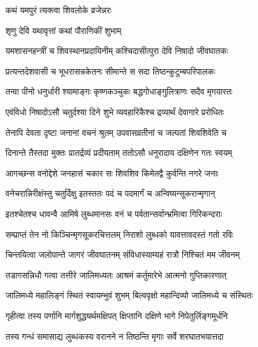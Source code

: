 \onelineshloka
{कथं यमपुरं त्यक्त्वा शिवलोके व्रजेन्नरः}%



\onelineshloka
{शृणु देवि यथावृत्तां कथां पौराणिकीं शुभाम्}%

\twolineshloka
{यमशासनहन्त्रीं च शिवस्थानप्रदायिनीम्}
{कश्चिदासीत्पुरा देवि निषादो जीवघातकः\footnotemark{}}%

\twolineshloka
{प्रत्यन्तदेशवासी च भूधरासन्नकेतनः}
{सीमान्ते स सदा तिष्ठन्कुटुम्बपरिपालकः}%

\twolineshloka
{तन्वा पीनो धनुर्धारी श्यामाङ्गः कृष्णकञ्चुकः}
{बद्धगोधाङ्गुलित्राणः सदैव मृगयारतः}%

\twolineshloka
{एवंविधो निषादोऽसौ चतुर्दश्या दिने शुभे}
{व्यवहारिकैश्च द्रव्यार्थं देवागारे प्ररोधितः}%

\twolineshloka
{तेनापि देवता दृष्टा जनानां वचनं श्रुतम्}
{उपवासव्रतीनां च जल्पतां शिवशिवेति च}%

\twolineshloka
{दिनान्ते तैस्तदा मुक्तः प्रातर्द्रव्यं प्रदीयताम्}
{ततोऽसौ धनुरादाय दक्षिणेन गतः स्वयम्}%

\twolineshloka
{आगच्छन्स वनोद्देशे जनहासं चकार सः}
{शिवशिव किमेतद्वै कुर्वन्ति नगरे जनाः}%

\twolineshloka
{वनेचरान्निरीक्षंस्तु चतुर्दिक्षु इतस्ततः}
{पदं च पदमार्गं च अन्विष्यन्सूकरान्मृगान्}%

\twolineshloka
{इतश्चेतश्च धावन्वै आमिषे लुब्धमानसः}
{वनं च पर्वतान्सर्वान्भ्रमित्वा गिरिकन्दराः}%

\twolineshloka
{सम्प्राप्तं तेन नो किञ्चिन्मृगसूकरचित्तलम्\footnotemark{}}
{निराशो लुब्धको यावत्तावदस्तं गतो रविः}%

\twolineshloka
{चिन्तयित्वा जलोपान्ते जागरं\footnotemark{} जीवघातनम्}
{संविधास्याम्यहं रात्रौ निश्चितं मम जीवनम्}%

\twolineshloka
{तडागसन्निधौ गत्वा तत्तीरे जालिमध्यतः}
{आश्रमं कर्तुमारेभे आत्मनो गुप्तिकारणात्}%

\twolineshloka
{जालिमध्ये महालिङ्गं स्थितं स्वायम्भुवं शुभम्}
{बिल्ववृक्षो महान्दिव्यो जालिमध्ये च संस्थितः}%

\twolineshloka
{गृहीत्वा तस्य पर्णानि मार्गशुद्ध्यर्थमक्षिपत्}
{क्षिप्तानि दक्षिणे भागे निपेतुर्लिङ्गमूर्धनि}%

\twolineshloka
{तस्य गन्धं समासाद्य लुब्धकस्य वरानने}
{न तिष्ठन्ति मृगाः सर्वे शरघातभयात्तदा}%

